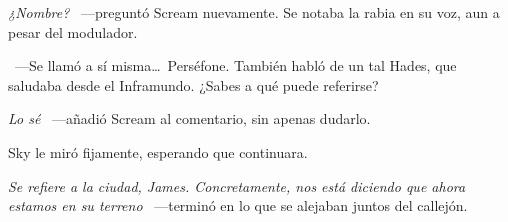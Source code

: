 \emph{¿Nombre?} ~---preguntó Scream nuevamente. Se notaba la rabia en su voz, aun a pesar del modulador.

~---Se llamó a sí misma\dots\ Perséfone. También habló de un tal Hades, que saludaba desde el Inframundo. ¿Sabes a qué puede referirse?

\emph{Lo sé} ~---añadió Scream al comentario, sin apenas dudarlo.

Sky le miró fijamente, esperando que continuara.

\emph{Se refiere a la ciudad, James. Concretamente, nos está diciendo que ahora estamos en su terreno} ~---terminó en lo que se alejaban juntos del callejón.

\endinput
